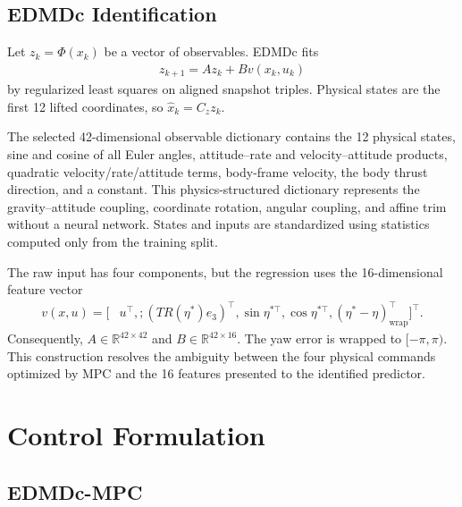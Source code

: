 \documentclass[letterpaper,10pt,conference]{ieeeconf}
\begin{document}
\subsection{EDMDc Identification}
\label{sec:edmdc}

Let $z_k=\Phi(x_k)$ be a vector of observables. EDMDc fits
\begin{align}
z_{k+1}=Az_k+Bv(x_k,u_k)
\label{eq:edmdc}
\end{align}
by regularized least squares on aligned snapshot triples. Physical states are
the first 12 lifted coordinates, so $\hat x_k=C_z z_k$.

The selected 42-dimensional observable dictionary contains the 12 physical
states, sine and cosine of all Euler angles, attitude--rate and
velocity--attitude products, quadratic velocity/rate/attitude terms,
body-frame velocity, the body thrust direction, and a constant. This
physics-structured dictionary represents the gravity--attitude coupling,
coordinate rotation, angular coupling, and affine trim without a neural
network. States and inputs are standardized using statistics computed only
from the training split.

The raw input has four components, but the regression uses the
16-dimensional feature vector
\begin{align}
v(x,u)=\big[&u^\top,;(T R(\eta^*)e_3)^\top,
\sin\eta^{*\top},\cos\eta^{*\top},
(\eta^*-\eta)_{\mathrm{wrap}}^\top\big]^\top.
\label{eq:input_lift}
\end{align}
Consequently, $A\in\mathbb{R}^{42\times42}$ and
$B\in\mathbb{R}^{42\times16}$. The yaw error is wrapped to
$[-\pi,\pi)$. This construction resolves the ambiguity between the four
physical commands optimized by MPC and the 16 features presented to the
identified predictor.

\section{Control Formulation}
\label{sec:control_formulation}

\subsection{EDMDc-MPC}
\end{document}
